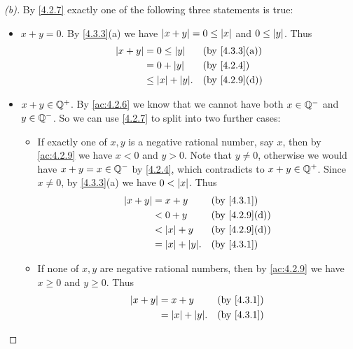 \begin{proof}[(b)]
  By \cref{4.2.7} exactly one of the following three statements is true:
  \begin{itemize}
    \item \(x + y = 0\).
          By \cref{4.3.3}(a) we have \(\left\lvert x + y\right\rvert = 0 \leq \left\lvert x\right\rvert\) and \(0 \leq \left\lvert y\right\rvert\).
          Thus
          \begin{align*}
            \abs{x + y} & = 0 \leq \abs{y}        &  & \by{4.3.3}[a] \\
                        & = 0 + \abs{y}           &  & \by{4.2.4}    \\
                        & \leq \abs{x} + \abs{y}. &  & \by{4.2.9}[d]
          \end{align*}
    \item \(x + y \in \mathbb{Q}^+\).
          By \cref{ac:4.2.6} we know that we cannot have both \(x \in \mathbb{Q}^-\) and \(y \in \mathbb{Q}^-\).
          So we can use \cref{4.2.7} to split into two further cases:
          \begin{itemize}
            \item If exactly one of \(x, y\) is a negative rational number, say \(x\), then by \cref{ac:4.2.9} we have \(x < 0\) and \(y > 0\).
                  Note that \(y \neq 0\), otherwise we would have \(x + y = x \in \mathbb{Q}^-\) by \cref{4.2.4}, which contradicts to \(x + y \in \mathbb{Q}^+\).
                  Since \(x \neq 0\), by \cref{4.3.3}(a) we have \(0 < \left\lvert x\right\rvert\).
                  Thus
                  \begin{align*}
                    \abs{x + y} & = x + y              &  & \by{4.3.1}    \\
                                & < 0 + y              &  & \by{4.2.9}[d] \\
                                & < \abs{x} + y        &  & \by{4.2.9}[d] \\
                                & = \abs{x} + \abs{y}. &  & \by{4.3.1}
                  \end{align*}
            \item If none of \(x, y\) are negative rational numbers, then by \cref{ac:4.2.9} we have \(x \geq 0\) and \(y \geq 0\).
                  Thus
                  \begin{align*}
                    \abs{x + y} & = x + y              &  & \by{4.3.1} \\
                                & = \abs{x} + \abs{y}. &  & \by{4.3.1}
                  \end{align*}

\end{itemize}
\end{itemize}
\end{proof}
